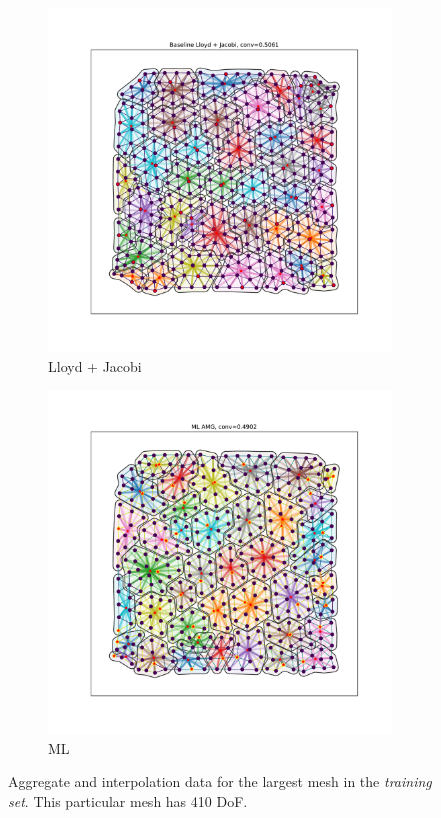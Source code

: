 \documentclass{article}
\begin{document}
\begin{figure}[h]
\begin{subfigure}[t]{0.32\textwidth}
    \includegraphics[width=\textwidth, trim=80 70 70 50, clip]{grid_largest_lloyd.pdf}
    \caption{Lloyd + Jacobi}
  \end{subfigure}
  \begin{subfigure}[t]{0.32\textwidth}
    \centering
    \includegraphics[width=\textwidth, trim=80 70 70 50, clip]{grid_largest_ml.pdf}
    \caption{ML}
  \end{subfigure}
  \caption{Aggregate and interpolation data for the largest mesh in the \textit{training set}.  This particular mesh has 410 DoF.}
  \label{fig:gridlargest}
\end{figure}
\end{document}
